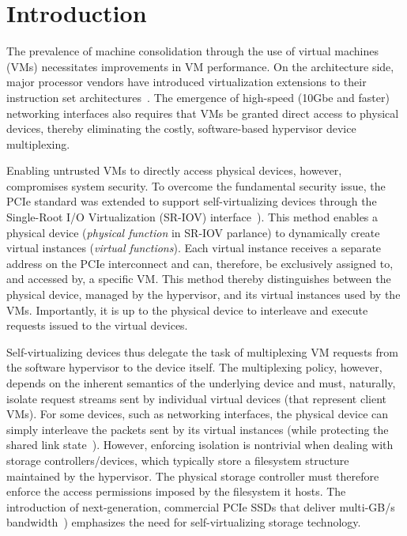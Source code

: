 \chapter{Introduction}
\label{chap:intro}



The prevalence of machine consolidation through the use of virtual machines (VMs) necessitates improvements in VM performance. On the architecture side, major processor vendors have introduced virtualization extensions to their instruction set architectures~\cite{popek1974formal,intel,armv8}.
The emergence of high-speed (10Gbe and faster) networking interfaces also requires that VMs be granted direct access to  physical devices, thereby eliminating the costly, software-based hypervisor device multiplexing.

Enabling untrusted VMs to directly access physical devices, however, compromises system security.
To overcome the fundamental security issue, the PCIe standard was extended to support self-virtualizing devices through the Single-Root I/O Virtualization (SR-IOV) interface~\cite{pcisigiov}).
This method enables a physical device (\emph{physical function} in SR-IOV parlance) to dynamically create virtual instances (\emph{virtual functions}). Each virtual instance receives a separate address on the PCIe interconnect and can, therefore, be exclusively assigned to, and accessed by, a specific VM. This method thereby distinguishes between the physical device, managed by the hypervisor, and its virtual instances used by the VMs.
%
Importantly, it is up to the physical device to interleave and execute requests issued to the virtual devices.

Self-virtualizing devices thus delegate the task of multiplexing VM requests from the software hypervisor to the device itself.
The multiplexing policy, however, depends on the inherent semantics of the underlying device and must, naturally, isolate request streams sent by individual virtual devices (that represent client VMs).
For some devices, such as networking interfaces, the physical device can simply interleave the packets sent by its virtual instances (while protecting the shared link state~\cite{smolyar15sriovsec}).
%
However, enforcing isolation is nontrivial when dealing with storage controllers/devices, which typically store a filesystem structure maintained by the hypervisor. The physical storage controller must therefore enforce the access permissions imposed by the filesystem it hosts.
%
The introduction of next-generation, commercial PCIe SSDs that deliver multi-GB/s bandwidth~\cite{intel-ssd,seagate16ssd}) emphasizes the need for self-virtualizing storage technology.

